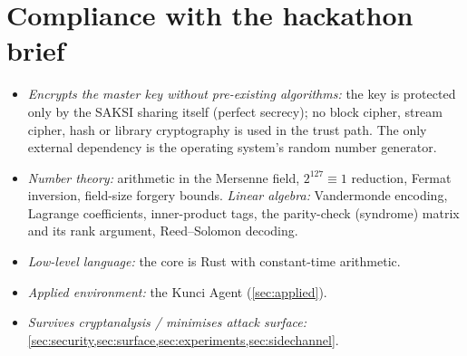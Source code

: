 \documentclass[11pt,a4paper]{article}
\theoremstyle{plain}
\theoremstyle{definition}
\begin{document}
\section{Compliance with the hackathon brief}\label{sec:brief}
\begin{itemize}
  \item \emph{Encrypts the master key without pre-existing algorithms:} the key is protected only by the
  SAKSI sharing itself (perfect secrecy); no block cipher, stream cipher, hash or library
  cryptography is used in the trust path. The only external dependency is the operating system's
  random number generator.
  \item \emph{Number theory:} arithmetic in the Mersenne field, $2^{127}\equiv1$ reduction, Fermat
  inversion, field-size forgery bounds.
  \emph{Linear algebra:} Vandermonde encoding, Lagrange coefficients, inner-product tags, the
  parity-check (syndrome) matrix and its rank argument, Reed--Solomon decoding.
  \item \emph{Low-level language:} the core is Rust with constant-time arithmetic.
  \item \emph{Applied environment:} the Kunci Agent (\cref{sec:applied}).
  \item \emph{Survives cryptanalysis / minimises attack surface:} \cref{sec:security,sec:surface,sec:experiments,sec:sidechannel}.
\end{itemize}
\end{document}

